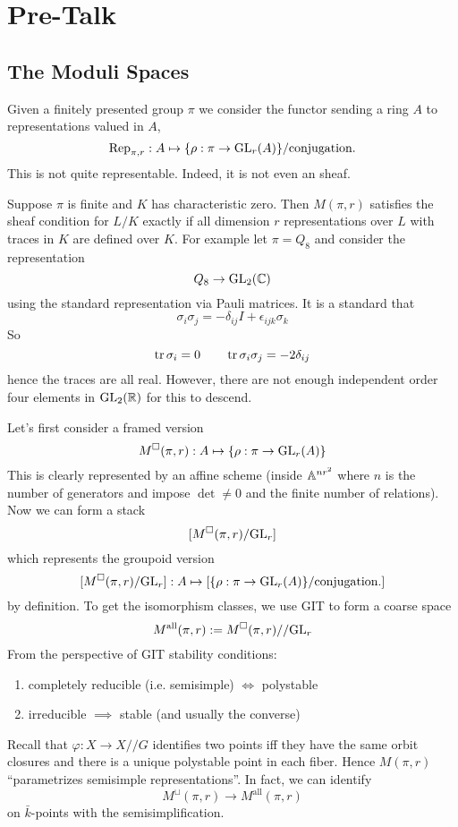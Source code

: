 \documentclass[12pt]{article}
\begin{document}
\section{Pre-Talk}

\subsection{The Moduli Spaces}

\newcommand{\all}{\mathrm{all}}

Given a finitely presented group $\pi$ we consider the functor sending a ring $A$ to representations valued in $A$,
\[ \mathrm{Rep}_{\pi, r} : A \mapsto \{ \rho : \pi \to \mathrm{GL}_r(A) \} / \text{conjugation}. \]
This is not quite representable. Indeed, it is not even an \etale sheaf. 

\begin{example}
Suppose $\pi$ is finite and $K$ has characteristic zero. Then $M(\pi, r)$ satisfies the sheaf condition for $L/K$ exactly if all dimension $r$ representations over $L$ with traces in $K$ are defined over $K$. For example let $\pi = Q_8$ and consider the representation
\[ Q_8 \to \mathrm{GL}_2(\mathbb{C}) \]
using the standard representation via Pauli matrices. It is a standard that
\[ \sigma_i \sigma_j = - \delta_{ij} I + \epsilon_{ijk} \sigma_k \]
So 
\[ \operatorname{\mathrm{tr}}{\sigma_i} = 0 \quad \quad \operatorname{\mathrm{tr}}{\sigma_i \sigma_j} = -2 \delta_{ij} \]
hence the traces are all real. However, there are not enough independent order four elements in $\mathrm{GL}_2(\mathbb{R})$ for this to descend. 
\end{example}

Let's first consider a framed version
\[ M^{\square}(\pi, r) : A \mapsto \{ \rho : \pi \to \mathrm{GL}_r(A) \} \]
This is clearly represented by an affine scheme (inside $\mathbb{A}^{nr^2}$ where $n$ is the number of generators and impose $\det \neq 0$ and the finite number of relations). Now we can form a stack
\[ [M^{\square}(\pi, r) / \mathrm{GL}_r] \]
which represents the groupoid version
\[ [M^{\square}(\pi, r) / \mathrm{GL}_r] : A \mapsto [\{ \rho : \pi \to \mathrm{GL}_r(A) \} / \text{conjugation}.] \]
by definition. To get the isomorphism classes, we use GIT to form a coarse space
\[ M^{\all}(\pi, r) := M^{\square}(\pi, r) // \GL_r \]
From the perspective of GIT stability conditions:
\begin{enumerate}
\item completely reducible (i.e. semisimple) $\iff$ polystable
\item irreducible $\implies$ stable (and usually the converse)
\end{enumerate}
Recall that $\varphi : X \to X // G$ identifies two points iff they have the same orbit closures and there is a unique polystable point in each fiber. Hence $M(\pi, r)$ ``parametrizes semisimple representations''. In fact, we can identify 
\[ M^{\sqcup}(\pi, r) \to M^{\all}(\pi, r) \]
on $\bar{k}$-points with the semisimplification. 
\end{document}
